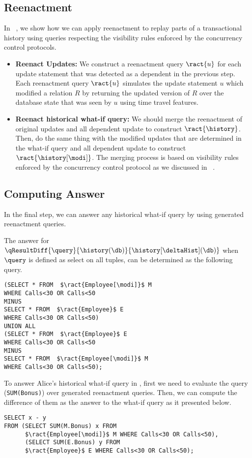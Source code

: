 \subsection{Reenactment}
\label{sec:reenactment}
In ~\cite{AG14,AG16,AG17}, we show how we can apply reenactment to replay parts of a transactional history using queries respecting the visibility rules enforced by the concurrency control protocols.
%
\begin{itemize}
\item \textbf{Reenact Updates:} We construct a reenactment query $\ract{u}$ for each update statement that was detected as a dependent in the previous step. Each reenactment query $\ract{u}$ simulates the update statement $u$ which modified a relation $R$ by returning the updated version of $R$ over the database state that was seen by $u$ using time travel features.
\item \textbf{Reenact historical what-if query:} We should merge the reenactment of original updates and all dependent update to construct $\ract{\history}$. Then, do the same thing with the modified updates that are determined in the what-if query and all dependent update to construct $\ract{\history[\modi]}$. The merging process is based on visibility rules enforced by the concurrency control protocol as we discussed in ~\cite{AG16,AG17}.
\end{itemize}

\subsection{Computing Answer}
\label{sec:answer}
In the final step, we can answer any historical what-if query by using generated reenactment queries.
\begin{exam}
The answer for $\qResultDiff{\query}{\history(\db)}{\history[\deltaHist](\db)}$ when $\query$ is defined as select on all tuples, can be determined as the following query.
\begin{lstlisting}
(SELECT * FROM  $\ract{Employee[\modi]}$ M
WHERE Calls<30 OR Calls<50
MINUS
SELECT * FROM  $\ract{Employee}$ E
WHERE Calls<30 OR Calls<50)
UNION ALL
(SELECT * FROM  $\ract{Employee}$ E
WHERE Calls<30 OR Calls<50
MINUS
SELECT * FROM  $\ract{Employee[\modi]}$ M
WHERE Calls<30 OR Calls<50);
\end{lstlisting}
To answer Alice's historical what-if query in , first we need to evaluate the query (\lstinline!SUM(Bonus)!) over generated reenactment queries. Then, we can compute the difference of them as the answer to the what-if query as it presented below.
\begin{lstlisting}
SELECT x - y
FROM (SELECT SUM(M.Bonus) x FROM
	  $\ract{Employee[\modi]}$ M WHERE Calls<30 OR Calls<50),
      (SELECT SUM(E.Bonus) y FROM
      $\ract{Employee}$ E WHERE Calls<30 OR Calls<50);
\end{lstlisting}
\end{exam}
%
%
%
%
%
%
%
%
%
%
%
%
%
%
%
%
%
%


